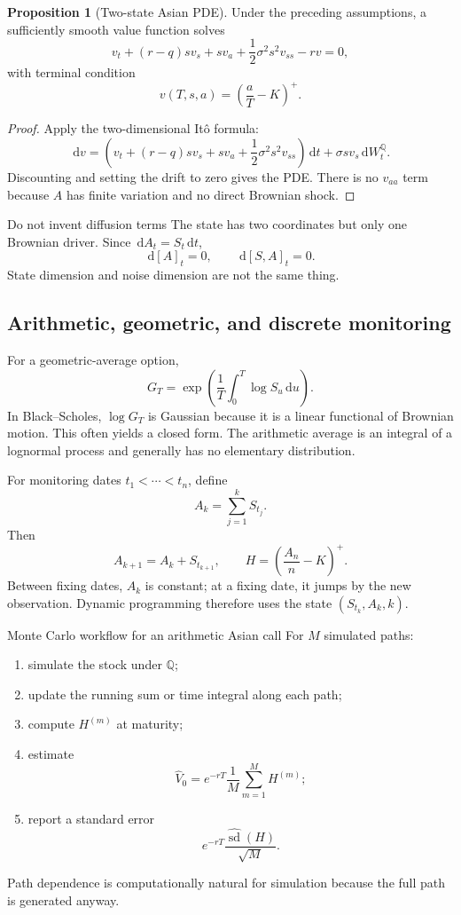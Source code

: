 \documentclass[10pt]{article}
\newcommand{\Q}{\mathbb Q}
\newcommand{\1}{\mathbf 1}
\newcommand{\dd}{\,\mathrm d}
\theoremstyle{definition}
\newtheorem{proposition}[definition]{Proposition}
\begin{document}
\begin{proposition}[Two-state Asian PDE]
Under the preceding assumptions, a sufficiently smooth value function solves
\[
\boxed{
v_t+(r-q)sv_s+sv_a
+\frac12\sigma^2s^2v_{ss}-rv=0,}
\]
with terminal condition
\[
\boxed{v(T,s,a)=\left(\frac aT-K\right)^+.}
\]
\end{proposition}

\begin{proof}
Apply the two-dimensional It\^o formula:
\[
\dd v
=\left(v_t+(r-q)sv_s+sv_a
+\frac12\sigma^2s^2v_{ss}\right)\dd t
+\sigma sv_s\dd W_t^\Q.
\]
Discounting and setting the drift to zero gives the PDE. There is no
\(v_{aa}\) term because \(A\) has finite variation and no direct Brownian
shock.
\end{proof}

\begin{warningbox}{Do not invent diffusion terms}
The state has two coordinates but only one Brownian driver. Since
\(\dd A_t=S_t\dd t\),
\[
\dd[A]_t=0,\qquad \dd[S,A]_t=0.
\]
State dimension and noise dimension are not the same thing.
\end{warningbox}

\subsection{Arithmetic, geometric, and discrete monitoring}

For a geometric-average option,
\[
G_T=\exp\left(\frac1T\int_0^T\log S_u\dd u\right).
\]
In Black--Scholes, \(\log G_T\) is Gaussian because it is a linear functional
of Brownian motion. This often yields a closed form. The arithmetic average
is an integral of a lognormal process and generally has no elementary
distribution.

For monitoring dates \(t_1<\cdots<t_n\), define
\[
A_k=\sum_{j=1}^kS_{t_j}.
\]
Then
\[
A_{k+1}=A_k+S_{t_{k+1}},
\qquad
H=\left(\frac{A_n}{n}-K\right)^+.
\]
Between fixing dates, \(A_k\) is constant; at a fixing date, it jumps by the
new observation. Dynamic programming therefore uses the state
\((S_{t_k},A_k,k)\).

\begin{boardexample}{Monte Carlo workflow for an arithmetic Asian call}
For \(M\) simulated paths:
\begin{enumerate}
  \item simulate the stock under \(\Q\);
  \item update the running sum or time integral along each path;
  \item compute \(H^{(m)}\) at maturity;
  \item estimate
  \[
  \widehat V_0=e^{-rT}\frac1M\sum_{m=1}^MH^{(m)};
  \]
  \item report a standard error
  \[
  e^{-rT}\frac{\widehat{\operatorname{sd}}(H)}{\sqrt M}.
  \]
\end{enumerate}
Path dependence is computationally natural for simulation because the full
path is generated anyway.
\end{boardexample}
\end{document}
